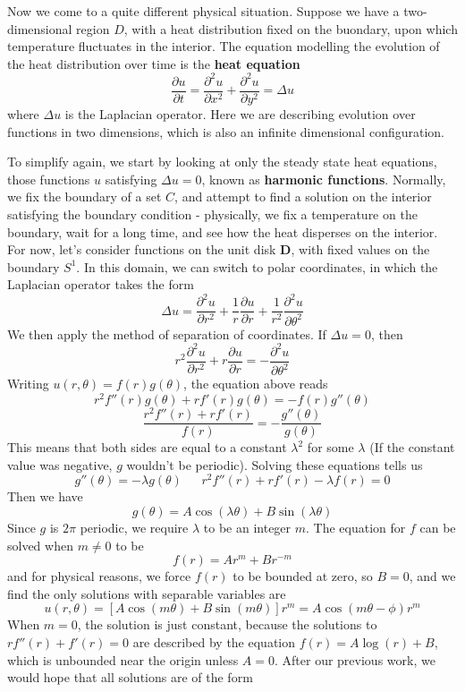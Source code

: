 Now we come to a quite different physical situation. Suppose we have a two-dimensional region $D$, with a heat distribution fixed on the buondary, upon which temperature fluctuates in the interior. The equation modelling the evolution of the heat distribution over time is the {\bf heat equation}
%
\[ \frac{\partial u}{\partial t} = \frac{\partial^2 u}{\partial x^2} + \frac{\partial^2 u}{\partial y^2} = \Delta u \]
%
where $\Delta u$ is the Laplacian operator. Here we are describing evolution over functions in two dimensions, which is also an infinite dimensional configuration.

To simplify again, we start by looking at only the steady state heat equations, those functions $u$ satisfying $\Delta u = 0$, known as {\bf harmonic functions}. Normally, we fix the boundary of a set $C$, and attempt to find a solution on the interior satisfying the boundary condition - physically, we fix a temperature on the boundary, wait for a long time, and see how the heat disperses on the interior. For now, let's consider functions on the unit disk $\mathbf{D}$, with fixed values on the boundary $S^1$. In this domain, we can switch to polar coordinates, in which the Laplacian operator takes the form
%
\[ \Delta u = \frac{\partial^2 u}{\partial r^2} + \frac{1}{r} \frac{\partial u}{\partial r} + \frac{1}{r^2} \frac{\partial^2 u}{\partial \theta^2} \]
%
We then apply the method of separation of coordinates. If $\Delta u = 0$, then
%
\[ r^2 \frac{\partial^2 u}{\partial r^2} + r \frac{\partial u}{\partial r} = - \frac{\partial^2 u}{\partial \theta^2} \]
%
Writing $u(r,\theta) = f(r)g(\theta)$, the equation above reads
%
\[ r^2 f''(r) g(\theta) + r f'(r) g(\theta) = - f(r) g''(\theta) \]
%
\[ \frac{r^2 f''(r) + r f'(r)}{f(r)} = - \frac{g''(\theta)}{g(\theta)} \]
%
This means that both sides are equal to a constant $\lambda^2$ for some $\lambda$ (If the constant value was negative, $g$ wouldn't be periodic). Solving these equations tells us
%
\[ g''(\theta) = - \lambda g(\theta)\ \ \ \ \ \ \ r^2 f''(r) + r f'(r) - \lambda f(r) = 0 \]
%
Then we have
%
\[ g(\theta) = A \cos(\lambda \theta) + B \sin(\lambda \theta) \]
%
Since $g$ is $2\pi$ periodic, we require $\lambda$ to be an integer $m$. The equation for $f$ can be solved when $m \neq 0$ to be
%
\[ f(r) = A r^m + B r^{-m} \]
%
and for physical reasons, we force $f(r)$ to be bounded at zero, so $B = 0$, and we find the only solutions with separable variables are
%
\[ u(r,\theta) = [A \cos(m \theta) + B \sin(m \theta)] r^m = A \cos(m \theta - \phi) r^m \]
%
When $m = 0$, the solution is just constant, because the solutions to $r f''(r) + f'(r) = 0$ are described by the equation $f(r) = A \log(r) + B$, which is unbounded near the origin unless $A = 0$. After our previous work, we would hope that all solutions are of the form
